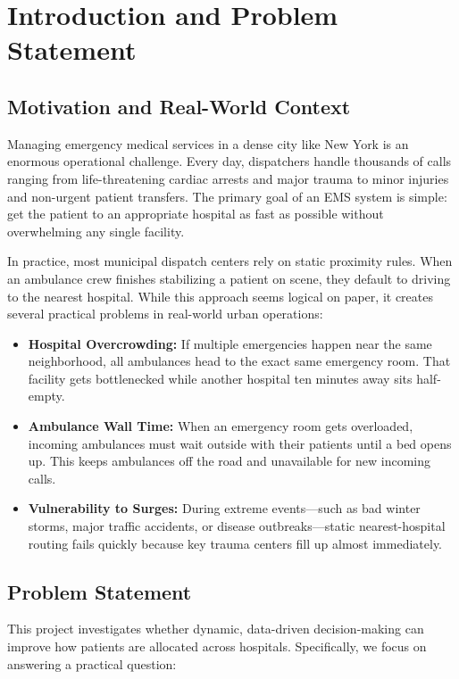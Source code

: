 \documentclass[11pt,a4paper]{article}
\begin{document}
\section{Introduction and Problem Statement}
\label{sec:intro}

\subsection{Motivation and Real-World Context}
Managing emergency medical services in a dense city like New York is an enormous operational challenge. Every day, dispatchers handle thousands of calls ranging from life-threatening cardiac arrests and major trauma to minor injuries and non-urgent patient transfers. The primary goal of an EMS system is simple: get the patient to an appropriate hospital as fast as possible without overwhelming any single facility.

In practice, most municipal dispatch centers rely on static proximity rules. When an ambulance crew finishes stabilizing a patient on scene, they default to driving to the nearest hospital. While this approach seems logical on paper, it creates several practical problems in real-world urban operations:
\begin{itemize}[leftmargin=*]
    \item \textbf{Hospital Overcrowding:} If multiple emergencies happen near the same neighborhood, all ambulances head to the exact same emergency room. That facility gets bottlenecked while another hospital ten minutes away sits half-empty.
    \item \textbf{Ambulance Wall Time:} When an emergency room gets overloaded, incoming ambulances must wait outside with their patients until a bed opens up. This keeps ambulances off the road and unavailable for new incoming calls.
    \item \textbf{Vulnerability to Surges:} During extreme events—such as bad winter storms, major traffic accidents, or disease outbreaks—static nearest-hospital routing fails quickly because key trauma centers fill up almost immediately.
\end{itemize}

\subsection{Problem Statement}
This project investigates whether dynamic, data-driven decision-making can improve how patients are allocated across hospitals. Specifically, we focus on answering a practical question:
\end{document}
